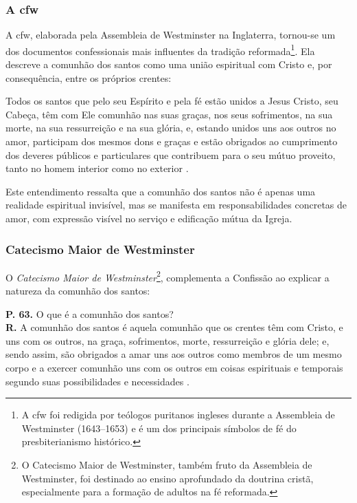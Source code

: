 \subsubsection{A \gls{cfw}} 
A \gls{cfw}, elaborada pela Assembleia de Westminster na Inglaterra, tornou-se um dos documentos confessionais mais influentes da tradição reformada\footnote{A \gls{cfw} foi redigida por teólogos puritanos ingleses durante a Assembleia de Westminster (1643–1653) e é um dos principais símbolos de fé do presbiterianismo histórico.}. Ela descreve a comunhão dos santos como uma união espiritual com Cristo e, por consequência, entre os próprios crentes:

\begin{citacao}
    Todos os santos que pelo seu Espírito e pela fé estão unidos a Jesus Cristo, seu Cabeça, têm com Ele comunhão nas suas graças, nos seus sofrimentos, na sua morte, na sua ressurreição e na sua glória, e, estando unidos uns aos outros no amor, participam dos mesmos dons e graças e estão obrigados ao cumprimento dos deveres públicos e particulares que contribuem para o seu mútuo proveito, tanto no homem interior como no exterior \cite[Cap.~XXVI, §~1º]{cfw}.
\end{citacao}

Este entendimento ressalta que a comunhão dos santos não é apenas uma realidade espiritual invisível, mas se manifesta em responsabilidades concretas de amor, com expressão visível no serviço e edificação mútua da Igreja.

\subsubsection{Catecismo Maior de Westminster}
O \textit{Catecismo Maior de Westminster}\footnote{O Catecismo Maior de Westminster, também fruto da Assembleia de Westminster, foi destinado ao ensino aprofundado da doutrina cristã, especialmente para a formação de adultos na fé reformada.}, complementa a Confissão ao explicar a natureza da comunhão dos santos:

\begin{citacao}
    \textbf{P. 63.} O que é a comunhão dos santos?\\
    \textbf{R.} A comunhão dos santos é aquela comunhão que os crentes têm com Cristo, e uns com os outros, na graça, sofrimentos, morte, ressurreição e glória dele; e, sendo assim, são obrigados a amar uns aos outros como membros de um mesmo corpo e a exercer comunhão uns com os outros em coisas espirituais e temporais segundo suas possibilidades e necessidades \cite{catecismoMaior}.
\end{citacao}

